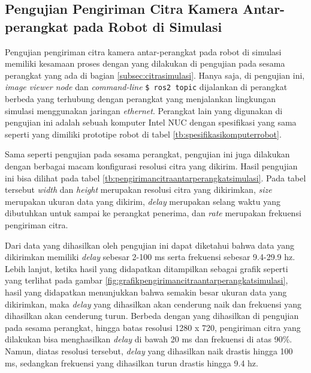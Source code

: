 \subsection{Pengujian Pengiriman Citra Kamera Antar-perangkat pada Robot di Simulasi}
\label{subsec:citraantarperangkatsimulasi}

Pengujian pengiriman citra kamera antar-perangkat pada robot di simulasi memiliki kesamaan proses dengan yang dilakukan di pengujian pada sesama perangkat yang ada di bagian \ref{subsec:citrasimulasi}.
Hanya saja, di pengujian ini, \emph{image viewer node} dan \emph{command-line} \lstinline{$ ros2 topic} dijalankan di perangkat berbeda yang terhubung dengan perangkat yang menjalankan lingkungan simulasi menggunakan jaringan \emph{ethernet}.
Perangkat lain yang digunakan di pengujian ini adalah sebuah komputer Intel NUC dengan spesifikasi yang sama seperti yang dimiliki prototipe robot di tabel \ref{tb:spesifikasikomputerrobot}.





Sama seperti pengujian pada sesama perangkat,
  pengujian ini juga dilakukan dengan berbagai macam konfigurasi resolusi citra yang dikirim.
Hasil pengujian ini bisa dilihat pada tabel \ref{tb:pengirimancitraantarperangkatsimulasi}.
Pada tabel tersebut \emph{width} dan \emph{height} merupakan resolusi citra yang dikirimkan,
  \emph{size} merupakan ukuran data yang dikirim,
  \emph{delay} merupakan selang waktu yang dibutuhkan untuk sampai ke perangkat penerima,
  dan \emph{rate} merupakan frekuensi pengiriman citra.

Dari data yang dihasilkan oleh pengujian ini dapat diketahui bahwa data yang dikirimkan memiliki \emph{delay} sebesar 2-100 ms serta frekuensi sebesar 9.4-29.9 hz.
Lebih lanjut, ketika hasil yang didapatkan ditampilkan sebagai grafik seperti yang terlihat pada gambar \ref{fig:grafikpengirimancitraantarperangkatsimulasi},
  hasil yang didapatkan menunjukkan bahwa semakin besar ukuran data yang dikirimkan,
  maka \emph{delay} yang dihasilkan akan cenderung naik dan frekuensi yang dihasilkan akan cenderung turun.
Berbeda dengan yang dihasilkan di pengujian pada sesama perangkat,
  hingga batas resolusi 1280 x 720,
  pengiriman citra yang dilakukan bisa menghasilkan \emph{delay} di bawah 20 ms dan frekuensi di atas 90\%.
Namun, diatas resolusi tersebut,
  \emph{delay} yang dihasilkan naik drastis hingga 100 ms,
  sedangkan frekuensi yang dihasilkan turun drastis hingga 9.4 hz.
